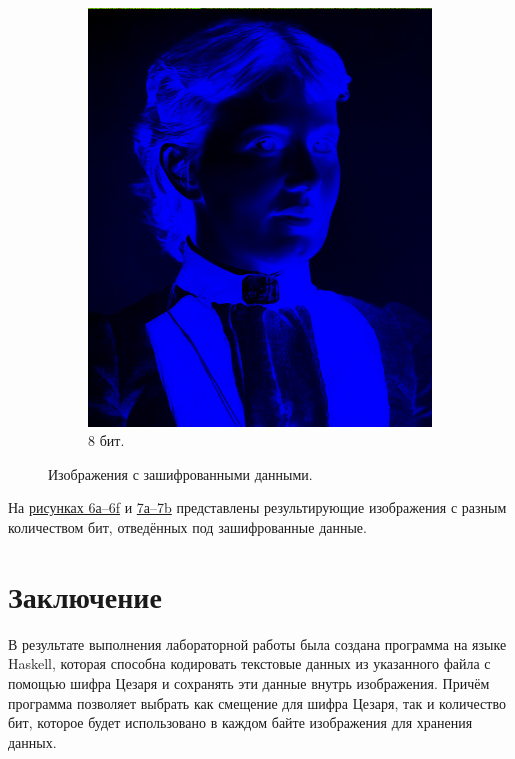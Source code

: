 \documentclass[11pt,a4paper,final]{article} %
\begin{document}
\begin{figure}[h!]
\begin{subfigure}[b]{0.3\linewidth}
		\includegraphics[width=\linewidth]{img/sofya2-8-5.jpg}
		\caption{8 бит.}
		\label{fig:s8}
	\end{subfigure}
	
	\caption{Изображения с зашифрованными данными.}
	\label{fig:new2}
\end{figure}












На \hyperref[fig:new1]{рисунках 6а--6f} и \hyperref[fig:new2]{7а--7b} представлены результирующие изображения с разным количеством бит, отведённых под зашифрованные данные.








\newpage
\section*{Заключение}
В результате выполнения лабораторной работы была создана программа на языке Haskell, которая способна кодировать текстовые данных из указанного файла с помощью шифра Цезаря и сохранять эти данные внутрь изображения. Причём программа позволяет выбрать как смещение для шифра Цезаря, так и количество бит, которое будет использовано в каждом байте изображения для хранения данных. 
\end{document}
